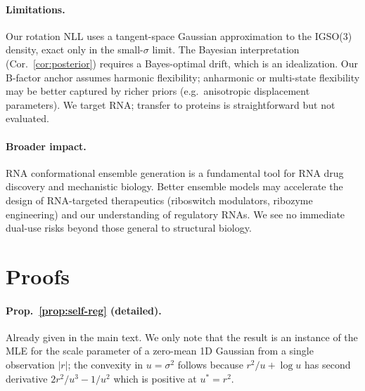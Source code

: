 \documentclass{article}
\theoremstyle{remark}
\theoremstyle{definition}
\begin{document}
\paragraph{Limitations.}
Our rotation NLL uses a tangent-space Gaussian approximation to the IGSO(3)
density, exact only in the small-$\sigma$ limit. The Bayesian interpretation
(Cor.~\ref{cor:posterior}) requires a Bayes-optimal drift, which is an
idealization. Our B-factor anchor assumes harmonic flexibility; anharmonic or
multi-state flexibility may be better captured by richer priors (e.g.\
anisotropic displacement parameters). We target RNA; transfer to proteins is
straightforward but not evaluated.

\paragraph{Broader impact.}
RNA conformational ensemble generation is a fundamental tool for RNA drug
discovery and mechanistic biology. Better ensemble models may accelerate the
design of RNA-targeted therapeutics (riboswitch modulators, ribozyme
engineering) and our understanding of regulatory RNAs. We see no immediate
dual-use risks beyond those general to structural biology.

\small



\clearpage

\appendix

\section{Proofs}
\label{app:proofs}

\paragraph{Prop.~\ref{prop:self-reg} (detailed).}
Already given in the main text. We only note that the result is an instance
of the MLE for the scale parameter of a zero-mean 1D Gaussian from a single
observation $|r|$; the convexity in $u=\sigma^2$ follows because
$r^2/u+\log u$ has second derivative $2r^2/u^3-1/u^2$ which is positive at
$u^{\ast}=r^2$.
\end{document}
